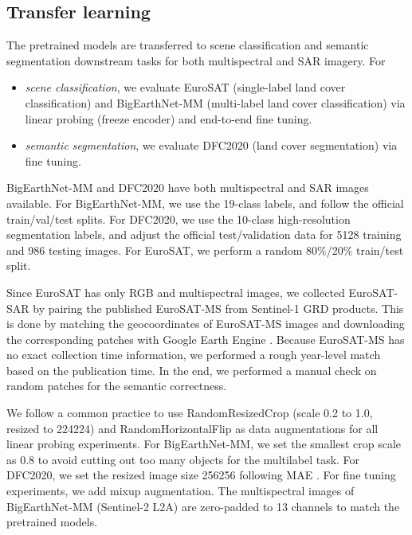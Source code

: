 \documentclass[lettersize,journal]{IEEEtran}
\begin{document}
\subsection{Transfer learning} 

\hspace{0.3em}
The pretrained models are transferred to scene classification and semantic segmentation downstream tasks for both multispectral and SAR imagery. For
\begin{itemize}
    \item \textit{scene classification}, we evaluate EuroSAT \citep{helber2019eurosat} (single-label land cover classification) and BigEarthNet-MM \citep{sumbul2021bigearthnet} (multi-label land cover classification) via linear probing (freeze encoder) and end-to-end fine tuning.
    \item \textit{semantic segmentation}, we evaluate DFC2020 \citep{schmitt2020ieee} (land cover segmentation) via fine tuning.
\end{itemize}

BigEarthNet-MM and DFC2020 have both multispectral and SAR images available. For BigEarthNet-MM, we use the 19-class labels, and follow the official train/val/test splits. For DFC2020, we use the 10-class high-resolution segmentation labels, and adjust the official test/validation data for 5128 training and 986 testing images. For EuroSAT, we perform a random 80\%/20\% train/test split.

Since EuroSAT has only RGB and multispectral images, we collected EuroSAT-SAR by pairing the published EuroSAT-MS from Sentinel-1 GRD products. This is done by matching the geocoordinates of EuroSAT-MS images and downloading the corresponding patches with Google Earth Engine \cite{gorelick2017google}. Because EuroSAT-MS has no exact collection time information, we performed a rough year-level match based on the publication time. In the end, we performed a manual check on random patches for the semantic correctness.


\vspace{0.5em}
\hspace{0.3em}
We follow a common practice to use RandomResizedCrop (scale 0.2 to 1.0, resized to 224224) and RandomHorizontalFlip as data augmentations for all linear probing experiments. For BigEarthNet-MM, we set the smallest crop scale as 0.8 to avoid cutting out too many objects for the multilabel task. For DFC2020, we set the resized image size 256256 following MAE \cite{he2022masked}. For fine tuning experiments, we add mixup \cite{zhang2018mixup} augmentation. The multispectral images of BigEarthNet-MM (Sentinel-2 L2A) are zero-padded to 13 channels to match the pretrained models.
\end{document}
